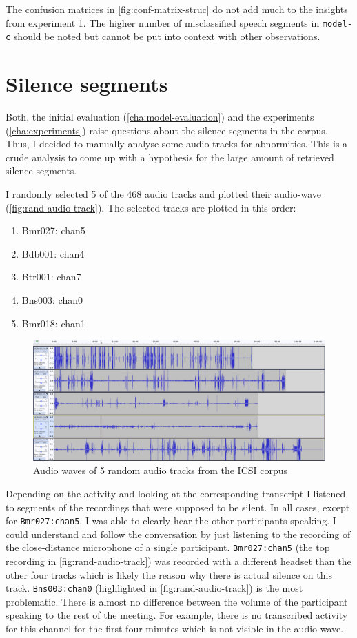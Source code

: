 \documentclass[bsc,frontabs,parskip,deptreport]{infthesis}
\begin{document}
The confusion matrices in \autoref{fig:conf-matrix-struc} do not add much to the insights from experiment 1. The higher number of misclassified speech segments in \texttt{model-c} should be noted but cannot be put into context with other observations.


\section{Silence segments}
Both, the initial evaluation (\autoref{cha:model-evaluation}) and the experiments (\autoref{cha:experiments}) raise questions about the silence segments in the corpus. Thus, I decided to manually analyse some audio tracks for abnormities. This is a crude analysis to come up with a hypothesis for the large amount of retrieved silence segments.

I randomly selected 5 of the 468 audio tracks and plotted their audio-wave (\autoref{fig:rand-audio-track}). The selected tracks are plotted in this order:
\begin{enumerate}
    \item Bmr027: chan5
    \item Bdb001: chan4
    \item Btr001: chan7
    \item Bns003: chan0
    \item Bmr018: chan1
\end{enumerate}

\begin{figure}[h!]
    \centering
    \includegraphics[width=14cm]{imgs/plotted_audio_waves.png}
    \caption{Audio waves of 5 random audio tracks from the ICSI corpus}
    \label{fig:rand-audio-track}
\end{figure}
Depending on the activity and looking at the corresponding transcript I listened to segments of the recordings that were supposed to be silent. In all cases, except for \verb|Bmr027:chan5|, I was able to clearly hear the other participants speaking. I could understand and follow the conversation by just listening to the recording of the close-distance microphone of a single participant. 
\verb|Bmr027:chan5| (the top recording in \autoref{fig:rand-audio-track}) was recorded with a different headset than the other four tracks which is likely the reason why there is actual silence on this track.
\verb|Bns003:chan0| (highlighted in \autoref{fig:rand-audio-track}) is the most problematic. There is almost no difference between the volume of the participant speaking to the rest of the meeting. For example, there is no transcribed activity for this channel for the first four minutes which is not visible in the audio wave.
\end{document}
